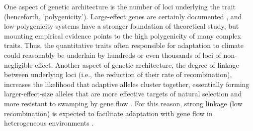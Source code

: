 \documentclass[9pt,twocolumn,twoside,lineno]{pnas-new}
\begin{document}
One aspect of genetic architecture is the number of loci 
underlying the trait (henceforth, 'polygenicity'). 
Large-effect genes are certainly documented \cite{martin,rees},
and low-polygenicity systems have a stronger foundation
of theoretical study,
but mounting empirical evidence points to the high polygenicity 
of many complex traits\cite{boyle,rockman,savolainen,sella,barghi_polygenic}.
Thus, the quantitative traits often responsible for adaptation to climate could reasonably be 
underlain by hundreds or even thousands of loci of non-negligible effect.
Another aspect of genetic architecture, the degree of linkage between underlying loci
(i.e., the reduction of their rate of recombination),
increases the likelihood that adaptive alleles cluster together,
essentially forming larger-effect-size alleles that are more 
effective targets of natural selection and more resistant
to swamping by gene flow \cite{yeaman_whitlock}.
For this reason, strong linkage (low recombination)
is expected to facilitate
adaptation with gene flow in heterogeneous environments \cite{tigano}.
\end{document}
